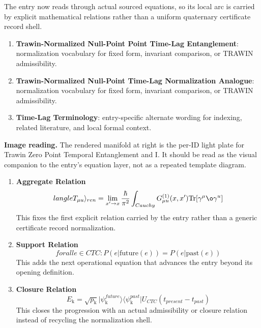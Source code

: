 The entry now reads through actual sourced equations, so its local arc is carried by explicit mathematical relations rather than a uniform quaternary certificate record shell.
\endgroup

\begin{enumerate}[leftmargin=1.6em,itemsep=6pt,topsep=4pt]
\item \textbf{Trawin-Normalized Null-Point Point Time-Lag Entanglement}: normalization vocabulary for fixed form, invariant comparison, or TRAWIN admissibility.
\item \textbf{Trawin-Normalized Null-Point Time-Lag Normalization Analogue}: normalization vocabulary for fixed form, invariant comparison, or TRAWIN admissibility.
\item \textbf{Time-Lag Terminology}: entry-specific alternate wording for indexing, related literature, and local formal context.
\end{enumerate}

\begin{samepage}
\noindent\begin{minipage}[t]{0.45\linewidth}
\vspace{0pt}
\raggedright
\scriptsize\textbf{Image reading.} The rendered manifold at right is the per-ID light plate for Trawin Zero Point Temporal Entanglement and I. It should be read as the visual companion to the entry's equation layer, not as a repeated template diagram.\par
\end{minipage}\hfill
\begin{minipage}[t]{0.53\linewidth}
\vspace*{-0.10in}
\raggedright
{}
\end{minipage}
\end{samepage}

\clearpage


\begin{enumerate}[leftmargin=1.6em,itemsep=9pt,topsep=6pt]
\item \textbf{Aggregate Relation}
\[
langle T_{\mu u} \rangle_{ren} = \lim_{x' \to x} \frac{\hbar}{\pi^2} \int_{Cauchy} G_{\mu u}^{(1)}(x, x') \text{Tr}[\gamma^\mu \o\gamma^ u]
\]
This fixes the first explicit relation carried by the entry rather than a generic certificate record normalization.

\item \textbf{Support Relation}
\[
forall e \in CTC : P(e | \text{future}(e)) = P(e | \text{past}(e))
\]
This adds the next operational equation that advances the entry beyond its opening definition.

\item \textbf{Closure Relation}
\[
E_{\mathrm{k}} = \sqrt{p_{\mathrm{k}}} \lvert \psi_{\mathrm{k}}^{future} \rangle \langle \psi_{\mathrm{k}}^{past}| U_{CTC}(t_{present} - t_{past})
\]
This closes the progression with an actual admissibility or closure relation instead of recycling the normalization shell.
\end{enumerate}

